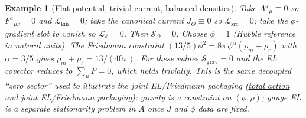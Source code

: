 \documentclass[11pt]{amsart}
\newtheorem{example}[theorem]{Example}
\begin{document}
\begin{example}[Flat potential, trivial current, balanced densities]
\label{ex:simultaneous}
Take \(A^a{}_\mu\equiv 0\) so \(F^a{}_{\mu\nu}=0\) and \(\mathcal{L}_{\mathrm{kin}}=0\); take the canonical current \(J_O\equiv 0\) so \(\mathcal{L}_{\mathrm{src}}=0\); take the \(\phi\)-gradient slot to vanish so \(\mathcal{L}_\phi=0\). Then \(\mathcal{S}_O=0\). Choose \(\phi=1\) (Hubble reference in natural units). The Friedmann constraint \((13/5)\phi^2 = 8\pi\,\phi^{\alpha}(\rho_m+\rho_r)\) with \(\alpha=3/5\) gives \(\rho_m+\rho_r = 13/(40\pi)\). For these values \(\mathcal{S}_{\mathrm{grav}}=0\) and the EL covector reduces to \(\sum_\mu F=0\), which holds trivially. This is the same decoupled ``zero sector'' used to illustrate the joint EL/Friedmann packaging (\hyperref[lean:total-action]{total action and joint EL/Friedmann packaging}): gravity is a constraint on \((\phi,\rho)\); gauge EL is a separate stationarity problem in \(A\) once \(J\) and \(\phi\) data are fixed.
\end{example}
\end{document}
